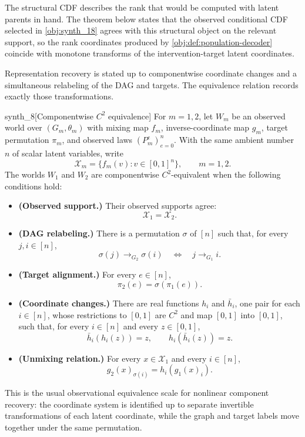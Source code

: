 \documentclass[11pt]{article}
\begin{document}
The structural CDF describes the rank that would be computed with latent parents in hand. The theorem below states that the observed conditional CDF selected in \cref{obj:synth_18} agrees with this structural object on the relevant support, so the rank coordinates produced by \cref{obj:def:population-decoder} coincide with monotone transforms of the intervention-target latent coordinates.

Representation recovery is stated up to componentwise coordinate changes and a simultaneous relabeling of the DAG and targets. The equivalence relation records exactly those transformations.

\begin{definitionv}{synth_8}[Componentwise \(C^2\) equivalence]
For \(m=1,2\), let \(W_m\) be an observed world over \((G_m,\theta_m)\) with mixing map \(f_m\), inverse-coordinate map \(g_m\), target permutation \(\pi_m\), and observed laws \((P_m^e)_{e=0}^n\). With the same ambient number \(n\) of scalar latent variables, write
\[
\mathcal X_m=\{f_m(v):v\in[0,1]^n\},\qquad m=1,2.
\]
The worlds \(W_1\) and \(W_2\) are componentwise \(C^2\)-equivalent when the following conditions hold:
\begin{itemize}
\item \textbf{(Observed support.)} Their observed supports agree:
\[
\mathcal X_1=\mathcal X_2.
\]
\item \textbf{(DAG relabeling.)} There is a permutation \(\sigma\) of \([n]\) such that, for every \(j,i\in[n]\),
\[
\sigma(j)\to_{G_2}\sigma(i)
\quad\Longleftrightarrow\quad
j\to_{G_1} i.
\]
\item \textbf{(Target alignment.)} For every \(e\in[n]\),
\[
\pi_2(e)=\sigma(\pi_1(e)).
\]
\item \textbf{(Coordinate changes.)} There are real functions \(h_i\) and \(\bar h_i\), one pair for each \(i\in[n]\), whose restrictions to \([0,1]\) are \(C^2\) and map \([0,1]\) into \([0,1]\), such that, for every \(i\in[n]\) and every \(z\in[0,1]\),
\[
\bar h_i(h_i(z))=z,
\qquad
h_i(\bar h_i(z))=z.
\]
\item \textbf{(Unmixing relation.)} For every \(x\in\mathcal X_1\) and every \(i\in[n]\),
\[
g_2(x)_{\sigma(i)}
=
h_i\!\left(g_1(x)_i\right).
\]
\end{itemize}
\end{definitionv}

This is the usual observational equivalence scale for nonlinear component recovery: the coordinate system is identified up to separate invertible transformations of each latent coordinate, while the graph and target labels move together under the same permutation.
\end{document}
